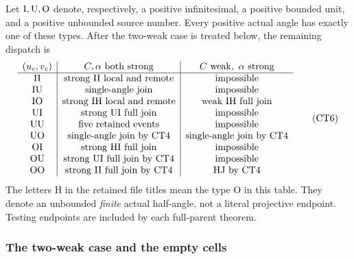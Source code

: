 Let \({\rm I},{\rm U},{\rm O}\) denote, respectively, a positive
infinitesimal, a positive bounded unit, and a positive unbounded
source number.  Every positive actual angle has exactly one of
these types.  After the two-weak case is treated below, the
remaining dispatch is
\[
\begin{array}{c|c|c}
(u_c,v_c)&C,\alpha\text{ both strong}
                 &C\text{ weak},\ \alpha\text{ strong}\\ \hline
{\rm II}&\text{strong II local and remote}&\text{impossible}\\
{\rm IU}&\text{single-angle join}&\text{impossible}\\
{\rm IO}&\text{strong IH local and remote}&\text{weak IH full join}\\
{\rm UI}&\text{strong UI full join}&\text{impossible}\\
{\rm UU}&\text{five retained events}&\text{impossible}\\
{\rm UO}&\text{single-angle join by CT4}&\text{single-angle join by CT4}\\
{\rm OI}&\text{strong HI full join}&\text{impossible}\\
{\rm OU}&\text{strong UI full join by CT4}&\text{impossible}\\
{\rm OO}&\text{strong II full join by CT4}&\text{HJ by CT4}
\end{array}\tag{CT6}
\]
The letters H in the retained file titles mean the type O in this
table.  They denote an unbounded \emph{finite} actual half-angle,
not a literal projective endpoint.  Testing endpoints are included
by each full-parent theorem.

\subsubsection*{The two-weak case and the empty cells}

